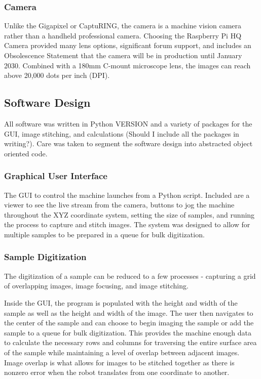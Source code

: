 \documentclass[a4paper,12pt]{article}
\begin{document}
\subsubsection{Camera}
Unlike the Gigapixel or CaptuRING, the camera is a machine vision camera rather than a handheld professional camera. Choosing the Raspberry Pi HQ Camera provided many lens options, significant
forum support, and includes an Obsolescence Statement that the camera will be in production until January 2030. Combined with a 180mm C-mount microscope lens, the images can reach above 20,000 dots per inch (DPI).

\subsection{Software Design}
All software was written in Python VERSION and a variety of packages for the GUI, image stitching, and calculations (Should I include all the packages in writing?). Care was taken to segment the
software design into abstracted object oriented code. 

\subsubsection{Graphical User Interface}
The GUI to control the machine launches from a Python script. Included are a viewer to see the live stream from the camera, buttons to jog the machine throughout the XYZ coordinate system,
setting the size of samples, and running the process to capture and stitch images. The system was designed to allow for multiple samples to be prepared in a queue for bulk digitization. 

\subsubsection{Sample Digitization}
The digitization of a sample can be reduced to a few processes - capturing a grid of overlapping images, image focusing, and image stitching. 

Inside the GUI, the program is populated with the height and width of the sample as well as the height and width of the image. The user then navigates to the center of the sample and can choose 
to begin imaging the sample or add the sample to a queue for bulk digitization. This provides the machine enough data to calculate the necessary rows and columns for traversing the entire surface
area of the sample while maintaining a level of overlap between adjacent images. Image overlap is what allows for images to be stitched together as there is nonzero error when the robot translates 
from one coordinate to another. 
\end{document}
